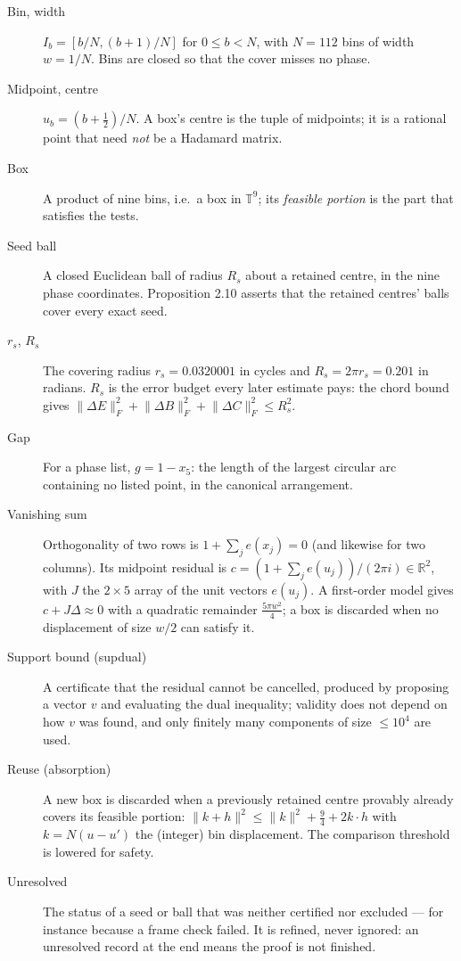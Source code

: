 \documentclass[11pt]{article}
\newcommand{\R}{\mathbb{R}}
\newcommand{\T}{\mathbb{T}}
\newcommand{\norm}[1]{\lVert #1\rVert}
\newcommand{\grp}[1]{\par\medskip\noindent{\normalsize\bfseries #1}\par\nobreak\vspace{-1pt}}
\begin{document}
\begin{description}
\item[Bin, width] $I_b=[b/N,(b{+}1)/N]$ for $0\le b<N$, with $N=112$ bins of width $w=1/N$. Bins are
closed so that the cover misses no phase.
\item[Midpoint, centre] $u_b=(b+\tfrac12)/N$. A box's centre is the tuple of midpoints; it is a
rational point that need \emph{not} be a Hadamard matrix.
\item[Box] A product of nine bins, i.e.\ a box in $\T^9$; its \emph{feasible portion} is the part that
satisfies the tests.
\item[Seed ball] A closed Euclidean ball of radius $R_s$ about a retained centre, in the nine phase
coordinates. Proposition 2.10 asserts that the retained centres' balls cover every exact seed.
\item[$r_s$, $R_s$] The covering radius $r_s=0.0320001$ in cycles and $R_s=2\pi r_s=0.201$ in radians.
$R_s$ is the error budget every later estimate pays: the chord bound gives
$\norm{\Delta E}_F^2+\norm{\Delta B}_F^2+\norm{\Delta C}_F^2\le R_s^2$.
\end{description}

\grp{4.\ The tests that discard a box}

\begin{description}
\item[Gap] For a phase list, $g=1-x_5$: the length of the largest circular arc containing no listed
point, in the canonical arrangement.
\item[Vanishing sum] Orthogonality of two rows is $1+\sum_{j}e(x_j)=0$ (and likewise for two columns).
Its midpoint residual is $c=(1+\sum_je(u_j))/(2\pi i)\in\R^2$, with $J$ the $2\times5$ array of the
unit vectors $e(u_j)$. A first-order model gives $c+J\Delta\approx0$ with a quadratic remainder
$\tfrac{5\pi w^2}{4}$; a box is discarded when no displacement of size $w/2$ can satisfy it.
\item[Support bound (supdual)] A certificate that the residual cannot be cancelled, produced by
proposing a vector $v$ and evaluating the dual inequality; validity does not depend on how $v$ was
found, and only finitely many components of size $\le10^4$ are used.
\item[Reuse (absorption)] A new box is discarded when a previously retained centre provably already
covers its feasible portion: $\norm{k+h}^2\le\norm{k}^2+\tfrac94+2k\cdot h$ with $k=N(u-u')$ the
(integer) bin displacement. The comparison threshold is lowered for safety.
\item[Unresolved] The status of a seed or ball that was neither certified nor excluded --- for
instance because a frame check failed. It is refined, never ignored: an unresolved record at the end
means the proof is not finished.
\end{description}
\end{document}
